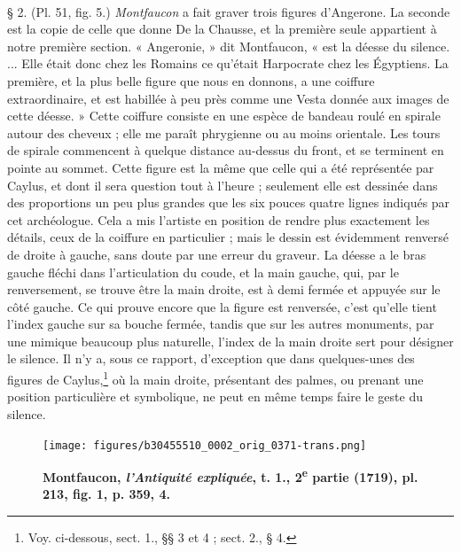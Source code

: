 \documentclass[a4paper, 11pt, oneside, polutonikogreek, french]{article}
\begin{document}
\paragraph{}
§ 2. (Pl. 51, fig. 5.) \emph{Montfaucon} a fait graver trois figures d'Angerone. La seconde est la copie de celle que donne De la Chausse, et la première seule appartient à notre première section. « Angeronie, » dit Montfaucon, « est la déesse du silence. ... Elle était donc chez les Romains ce qu'était Harpocrate chez les Égyptiens. La première, et la plus belle figure que nous en donnons, a une coiffure extraordinaire, et est habillée à peu près comme une Vesta donnée aux images de cette déesse. » Cette coiffure consiste en une espèce de bandeau roulé en spirale autour des cheveux ; elle me paraît phrygienne ou au moins orientale. Les tours de spirale commencent à quelque distance au-dessus du front, et se terminent en pointe au sommet. Cette figure est la même que celle qui a été représentée par Caylus, et dont il sera question tout à l'heure ; seulement elle est dessinée dans des proportions un peu plus grandes que les six pouces quatre lignes indiqués par cet archéologue. Cela a mis l'artiste en position de rendre plus exactement les détails, ceux de la coiffure en particulier ; mais le dessin est évidemment renversé de droite à gauche, sans doute par une erreur du graveur. La déesse a le bras gauche fléchi dans l'articulation du coude, et la main gauche, qui, par le renversement, se trouve être la main droite, est à demi fermée et appuyée sur le côté gauche. Ce qui prouve encore que la figure est renversée, c'est qu'elle tient l'index gauche sur sa bouche fermée, tandis que sur les autres monuments, par une mimique beaucoup plus naturelle, l'index de la main droite sert pour désigner le silence. Il n'y a, sous ce rapport, d'exception que dans quelques-unes des figures de Caylus,\footnote{Voy. ci-dessous, sect. 1., §§ 3 et 4 ; sect. 2., § 4.} où la main droite, présentant des palmes, ou prenant une position particulière et symbolique, ne peut en même temps faire le geste du silence.
\clearpage
\vspace*{\fill}
\begin{figure}[H]
\centering
\texttt{[image: figures/b30455510\_0002\_orig\_0371-trans.png]}
\caption{\bfseries Montfaucon, \emph{l'Antiquité expliquée}, t. 1., 2\textsuperscript{e} partie (1719), pl. 213, fig. 1, p. 359, 4.}
\end{figure}
\vspace*{\fill}
\clearpage
\end{document}
